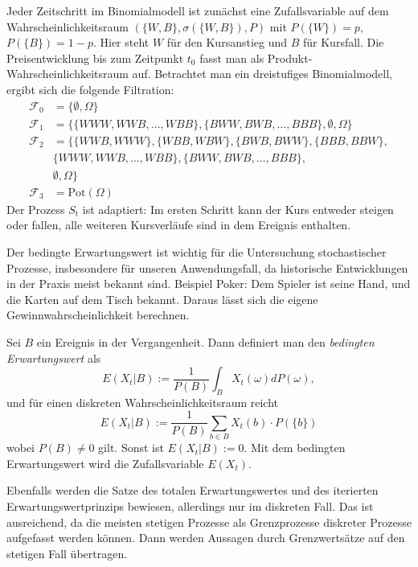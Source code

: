 \begin{bsp}
Jeder Zeitschritt im Binomialmodell ist zunächst eine Zufallsvariable auf dem 
Wahrscheinlichkeitsraum $(\{W, B\}, \sigma(\{W, B\}), P)$ mit 
$P(\{W \}) = p$, $P(\{B \}) = 1-p$. Hier steht $W$ für den Kursanstieg und $B$ für Kursfall. Die Preisentwicklung bis zum Zeitpunkt $t_0$ fasst man als Produkt-Wahrscheinlichkeitsraum auf.
Betrachtet man ein dreistufiges Binomialmodell, ergibt sich die folgende Filtration: 
$$
\begin{aligned}
\mathcal F_0 &= \{\emptyset, \Omega\} \\
\mathcal F_1 &= \{\{WWW, WWB, \dots, WBB \}, \{ BWW, BWB, \dots, BBB \},\emptyset, \Omega \} \\ 
\mathcal F_2 &= \{ \{WWB, WWW \}, \{WBB, WBW \}, \{BWB, BWW \}, \{BBB, BBW \}, \\ &\{WWW, WWB, \dots, WBB \}, \{ BWW, BWB, \dots, BBB \}, \\ &\emptyset, \Omega \} \\
\mathcal F_3 &= \text{Pot}(\Omega)
\end{aligned}
$$
Der Prozess $S_t$ ist adaptiert: Im ersten Schritt kann der Kurs entweder steigen oder
fallen, alle weiteren Kursverläufe sind in dem Ereignis enthalten.

\end{bsp}

\begin{defi}

Der bedingte Erwartungswert ist wichtig für die Untersuchung stochastischer Prozesse,
insbesondere für unseren Anwendungsfall, da historische Entwicklungen in der Praxis 
meist bekannt sind. Beispiel Poker: Dem Spieler ist seine Hand, und die Karten auf dem 
Tisch bekannt. Daraus lässt sich die eigene Gewinnwahrscheinlichkeit berechnen.

Sei $B$ ein Ereignis in der Vergangenheit. Dann definiert man
den \textit{bedingten Erwartungswert} als $$E(X_t|B):=  \frac{1}{P(B)} \int_{B}^{} X_t(\omega) dP(\omega),$$
und für einen diskreten Wahrscheinlichkeitsraum reicht
$$E(X_t|B):= \frac{1}{P(B)}\sum_{b \in B} X_t(b) \cdot P(\{ b \})$$
wobei $P(B) \neq 0$ gilt. Sonst ist $E(X_t|B) :=0$. 
Mit dem bedingten Erwartungswert wird die Zufallsvariable $E(X_t)$.

Ebenfalls werden die Satze des totalen Erwartungswertes und des iterierten Erwartungswertprinzips bewiesen,
allerdings nur im diskreten Fall. Das ist ausreichend, da die meisten stetigen 
Prozesse als Grenzprozesse diskreter Prozesse aufgefasst werden können.
Dann werden Aussagen durch Grenzwertsätze auf den stetigen Fall übertragen. 

\end{defi}

